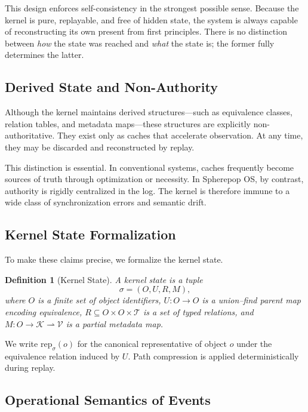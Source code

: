 \documentclass[11pt]{article}
\newtheorem{definition}{Definition}[section]
\begin{document}
This design enforces self-consistency in the strongest possible sense.
Because the kernel is pure, replayable, and free of hidden state, the system
is always capable of reconstructing its own present from first principles.
There is no distinction between \emph{how} the state was reached and
\emph{what} the state is; the former fully determines the latter.

\subsection{Derived State and Non-Authority}

Although the kernel maintains derived structures—such as equivalence
classes, relation tables, and metadata maps—these structures are explicitly
non-authoritative. They exist only as caches that accelerate observation.
At any time, they may be discarded and reconstructed by replay.

This distinction is essential. In conventional systems, caches frequently
become sources of truth through optimization or necessity. In Spherepop OS,
by contrast, authority is rigidly centralized in the log. The kernel is
therefore immune to a wide class of synchronization errors and semantic
drift.

\subsection{Kernel State Formalization}

To make these claims precise, we formalize the kernel state.

\begin{definition}[Kernel State]
A kernel state is a tuple
\[
\sigma = (O, U, R, M),
\]
where $O$ is a finite set of object identifiers, $U : O \to O$ is a
union--find parent map encoding equivalence, $R \subseteq O \times O \times
\mathcal{T}$ is a set of typed relations, and $M : O \to \mathcal{K}
\rightharpoonup \mathcal{V}$ is a partial metadata map.
\end{definition}

We write $\mathrm{rep}_\sigma(o)$ for the canonical representative of object
$o$ under the equivalence relation induced by $U$. Path compression is
applied deterministically during replay.

\subsection{Operational Semantics of Events}
\end{document}
